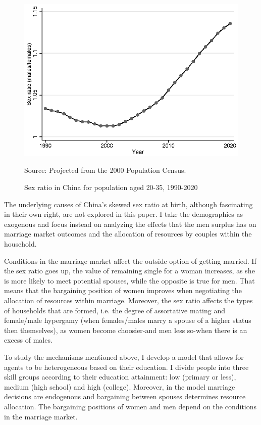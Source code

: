 \documentclass[12pt]{article}
\newcommand{\source}[1]{\caption*{Source: {#1}} }
\begin{document}
\begin{figure}[]
	\centering
	\caption{Sex ratio in China for population aged 20-35, 1990-2020}
	\includegraphics[width=.6\textwidth]{sex_ratio_20_35}
	\label{sex_ratio_20_30}
	\source{Projected from the 2000 Population Census.}
\end{figure}

The underlying causes of China's skewed sex ratio at birth, although fascinating in their own right, are not explored in this paper. I take the demographics as exogenous and focus instead on analyzing the effects that the men surplus has on marriage market outcomes and the allocation of resources by couples within the household.

Conditions in the marriage market affect the outside option of getting married. If the sex ratio goes up, the value of remaining single for a woman increases, as she is more likely to meet potential spouses, while the opposite is true for men. That means that the bargaining position of women improves when negotiating the allocation of resources within marriage. Moreover, the sex ratio affects the types of households that are formed, i.e. the degree of assortative mating and female/male hypergamy (when females/males marry a spouse of a higher status then themselves), as women become choosier-and men less so-when there is an excess of males.

To study the mechanisms mentioned above, I develop a model that allows for agents to be heterogeneous based on their education. I divide people into three skill groups according to their education attainment: low (primary or less), medium (high school) and high (college). Moreover, in the model marriage decisions are endogenous and bargaining between spouses determines resource allocation. The bargaining positions of women and men depend on the conditions in the marriage market. 
\end{document}
